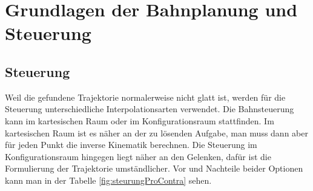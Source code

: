 %

%
%



\section{Grundlagen der Bahnplanung und Steuerung}


\subsection{Steuerung}
\label{bahnplanung_steuerung_sec}

Weil die gefundene Trajektorie normalerweise nicht glatt ist, werden für die Steuerung unterschiedliche Interpolationsarten verwendet.
Die Bahnsteuerung kann im kartesischen Raum oder im Konfigurationsraum stattfinden.
Im kartesischen Raum ist es näher an der zu lösenden Aufgabe, man muss dann aber für jeden Punkt die inverse Kinematik berechnen.
Die Steuerung im Konfigurationsraum hingegen liegt näher an den Gelenken, dafür ist die Formulierung der Trajektorie umständlicher.
Vor und Nachteile beider Optionen kann man in der Tabelle \ref{fig:steurungProContra} sehen.


